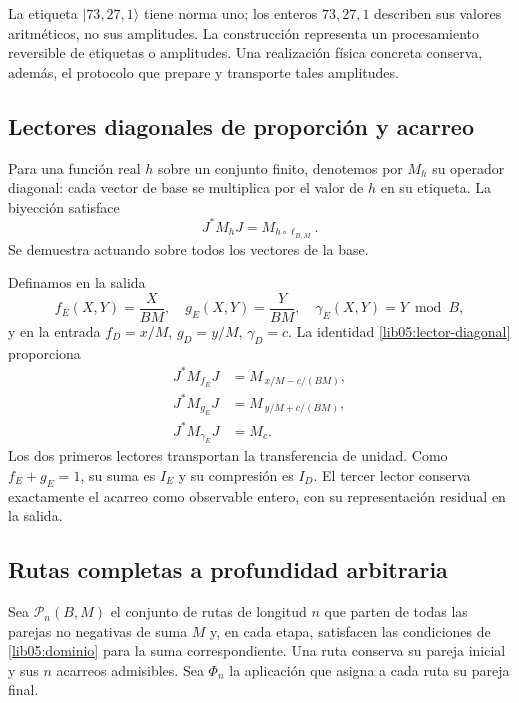 La etiqueta \(|73,27,1\rangle\) tiene norma uno; los enteros
\(73,27,1\) describen sus valores aritméticos, no sus amplitudes.
La construcción representa un procesamiento reversible de etiquetas
o amplitudes. Una realización física concreta conserva, además,
el protocolo que prepare y transporte tales amplitudes.

\subsection{Lectores diagonales de proporción y acarreo}
\label{lib05:diagonales}

Para una función real \(h\) sobre un conjunto finito, denotemos
por \(M_h\) su operador diagonal: cada vector de base se multiplica
por el valor de \(h\) en su etiqueta. La biyección satisface
\begin{equation}
 J^*M_hJ=M_{h\circ\ell_{B,M}}.
 \label{lib05:lector-diagonal}
\end{equation}
Se demuestra actuando sobre todos los vectores de la base.

Definamos en la salida
\begin{equation}
 f_E(X,Y)=\frac{X}{BM},\quad
 g_E(X,Y)=\frac{Y}{BM},\quad
 \gamma_E(X,Y)=Y\bmod B,
 \label{lib05:lectores-salida}
\end{equation}
y en la entrada \(f_D=x/M\), \(g_D=y/M\), \(\gamma_D=c\).
La identidad \eqref{lib05:lector-diagonal} proporciona
\begin{align}
 J^*M_{f_E}J&=M_{\,x/M-c/(BM)},\nonumber\\
 J^*M_{g_E}J&=M_{\,y/M+c/(BM)},\nonumber\\
 J^*M_{\gamma_E}J&=M_c.
 \label{lib05:transporte-fracciones}
\end{align}
Los dos primeros lectores transportan la transferencia de unidad.
Como \(f_E+g_E=1\), su suma es \(I_E\) y su compresión es
\(I_D\). El tercer lector conserva exactamente el acarreo como
observable entero, con su representación residual en la salida.

\subsection{Rutas completas a profundidad arbitraria}
\label{lib05:rutas}

Sea \(\mathcal P_n(B,M)\) el conjunto de rutas de longitud \(n\)
que parten de todas las parejas no negativas de suma \(M\) y, en
cada etapa, satisfacen las condiciones de
\eqref{lib05:dominio} para la suma correspondiente. Una ruta conserva
su pareja inicial y sus \(n\) acarreos admisibles. Sea
\(\Phi_n\) la aplicación que asigna a cada ruta su pareja final.

